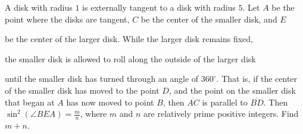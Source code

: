 A disk with radius $1$ is externally tangent to a disk with radius $5$. Let $A$ be the point where the disks are tangent, $C$ be the center of the smaller disk, and $E$

 be the center of the larger disk. While the larger disk remains fixed, 

the smaller disk is allowed to roll along the outside of the larger disk

 until the smaller disk has turned through an angle of $360^\circ$. That is, if the center of the smaller disk has moved to the point $D$,  and the point on the smaller disk that began at $A$ has now moved to point $B$,  then $\overline{AC}$ is parallel to $\overline{BD}$. Then $\sin^2(\angle BEA)=\tfrac{m}{n}$,  where $m$ and $n$ are relatively prime positive integers. Find $m+n$.
